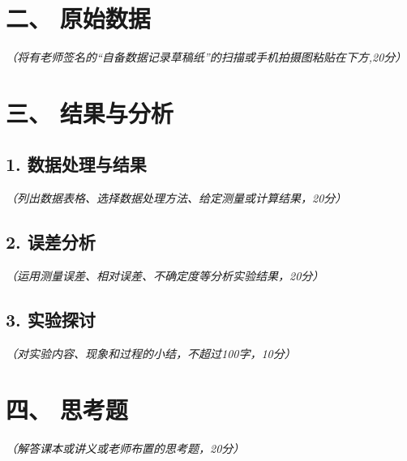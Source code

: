 \documentclass{article}
\begin{document}
\section*{二、 原始数据}
\textit{（将有老师签名的“自备数据记录草稿纸”的扫描或手机拍摄图粘贴在下方,20分）} \\


\section*{三、 结果与分析}
\subsection*{1. 数据处理与结果}
\textit{（列出数据表格、选择数据处理方法、给定测量或计算结果，20分）} \\


\subsection*{2. 误差分析}
\textit{（运用测量误差、相对误差、不确定度等分析实验结果，20分）} \\


\subsection*{3. 实验探讨}
\textit{（对实验内容、现象和过程的小结，不超过100字，10分）} \\


\section*{四、 思考题}
\textit{（解答课本或讲义或老师布置的思考题，20分）} \\
\end{document}
